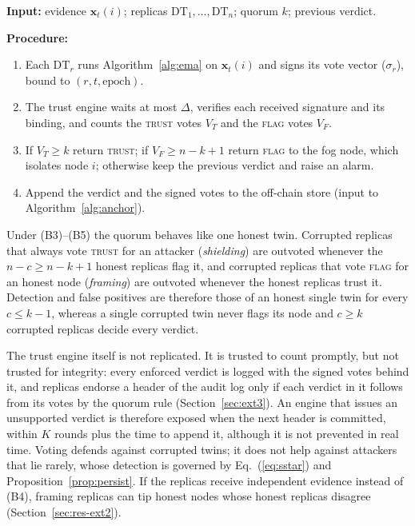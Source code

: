 \documentclass{ieeeaccess}
\begin{document}
\begin{algorithm}[!t]
\caption{Per-round vote for node $i$.}
\label{alg:vote}
\noindent\textbf{Input:} evidence $\mathbf{x}_t(i)$; replicas
$\mathrm{DT}_1,\dots,\mathrm{DT}_n$; quorum $k$; previous verdict.

\noindent\textbf{Procedure:}
\begin{enumerate}\setlength{\itemsep}{0pt}\setlength{\parskip}{0pt}
  \item Each $\mathrm{DT}_r$ runs Algorithm~\ref{alg:ema} on
        $\mathbf{x}_t(i)$ and signs its vote vector ($\sigma_r$),
        bound to $(r,t,\text{epoch})$.
  \item The trust engine waits at most $\Delta$, verifies each received
        signature and its binding, and counts the \textsc{trust} votes
        $V_T$ and the \textsc{flag} votes $V_F$.
  \item If $V_T\geq k$ return \textsc{trust}; if $V_F\geq n-k+1$ return
        \textsc{flag} to the fog node, which isolates node $i$;
        otherwise keep the previous verdict and raise an alarm.
  \item Append the verdict and the signed votes to the off-chain store
        (input to Algorithm~\ref{alg:anchor}).
\end{enumerate}
\end{algorithm}

Under (B3)--(B5) the quorum behaves like one honest twin.  Corrupted
replicas that always vote \textsc{trust} for an attacker
(\emph{shielding}) are outvoted whenever the $n-c\geq n-k+1$ honest
replicas flag it, and corrupted replicas that vote \textsc{flag} for an
honest node (\emph{framing}) are outvoted whenever the honest replicas
trust it.  Detection and false positives are therefore those of an
honest single twin for every $c\le k-1$, whereas a single corrupted
twin never flags its node and $c\geq k$ corrupted replicas decide every
verdict.

The trust engine itself is not replicated.  It is trusted to count
promptly, but not trusted for integrity: every enforced verdict is
logged with the signed votes behind it, and replicas endorse a header
of the audit log only if each verdict in it follows from its votes by
the quorum rule (Section~\ref{sec:ext3}).  An engine that issues an
unsupported verdict is therefore exposed when the next header is
committed, within $K$ rounds plus the time to append it, although it
is not prevented in real time.  Voting defends
against corrupted twins; it does not help against attackers that lie
rarely, whose detection is governed by
Eq.~(\ref{eq:sstar}) and Proposition~\ref{prop:persist}.
If the replicas receive independent evidence instead of (B4), framing
replicas can tip honest nodes whose honest replicas disagree
(Section~\ref{sec:res-ext2}).
\end{document}

